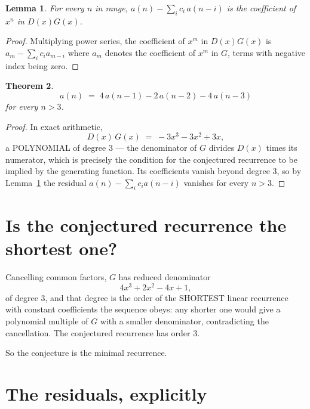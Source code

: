 \documentclass[11pt,a4paper]{article}
\theoremstyle{plain}
\newtheorem{theorem}{Theorem}
\newtheorem{lemma}[theorem]{Lemma}
\theoremstyle{definition}
\begin{document}
\begin{lemma}\label{lem:key}
For every $n$ in range, $a(n)-\sum_i c_i\,a(n-i)$ is the coefficient of $x^{n}$ in
$D(x)G(x)$.
\end{lemma}

\begin{proof}
Multiplying power series, the coefficient of $x^{m}$ in $D(x)G(x)$ is
$a_m-\sum_i c_i a_{m-i}$ where $a_m$ denotes the coefficient of $x^{m}$ in $G$, terms with
negative index being zero.
\end{proof}

\begin{theorem}
\[
a(n)\;=\;4\,a(n-1) - 2\,a(n-2) - 4\,a(n-3)
\]
for every $n>3$.
\end{theorem}

\begin{proof}
In exact arithmetic,
\[
D(x)\,G(x)\;=\;- 3 x^{3} - 3 x^{2} + 3 x,
\]
a POLYNOMIAL of degree $3$ --- the denominator of $G$ divides $D(x)$ times its numerator,
which is precisely the condition for the conjectured recurrence to be implied by the
generating function. Its coefficients vanish beyond degree $3$, so by
Lemma~\ref{lem:key} the residual $a(n)-\sum_ic_ia(n-i)$ vanishes for every
$n>3$.
\end{proof}

\section{Is the conjectured recurrence the shortest one?}

Cancelling common factors, $G$ has reduced denominator
\[
4 x^{3} + 2 x^{2} - 4 x + 1,
\]
of degree $3$, and that degree is the order of the SHORTEST linear recurrence with
constant coefficients the sequence obeys: any shorter one would give a polynomial multiple of
$G$ with a smaller denominator, contradicting the cancellation. The conjectured recurrence has
order $3$.

So the conjecture is the minimal recurrence.

\section{The residuals, explicitly}
\end{document}
